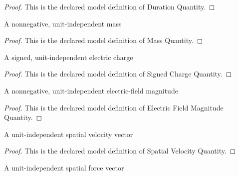 \begin{proof}
  This is the declared model definition of Duration Quantity.
\end{proof}
\begin{definition}
  \label{def:physics:phyx-mini-0912:phyxminiproblems-problemphyxmini0912-massquantity}
  A nonnegative, unit-independent mass
\end{definition}
\begin{proof}
  This is the declared model definition of Mass Quantity.
\end{proof}
\begin{definition}
  \label{def:physics:phyx-mini-0912:phyxminiproblems-problemphyxmini0912-signedchargequantity}
  A signed, unit-independent electric charge
\end{definition}
\begin{proof}
  This is the declared model definition of Signed Charge Quantity.
\end{proof}
\begin{definition}
  \label{def:physics:phyx-mini-0912:phyxminiproblems-problemphyxmini0912-electricfieldmagnitudequantity}
  A nonnegative, unit-independent electric-field magnitude
\end{definition}
\begin{proof}
  This is the declared model definition of Electric Field Magnitude Quantity.
\end{proof}
\begin{definition}
  \label{def:physics:phyx-mini-0912:phyxminiproblems-problemphyxmini0912-spatialvelocityquantity}
  A unit-independent spatial velocity vector
\end{definition}
\begin{proof}
  This is the declared model definition of Spatial Velocity Quantity.
\end{proof}
\begin{definition}
  \label{def:physics:phyx-mini-0912:phyxminiproblems-problemphyxmini0912-spatialforcequantity}
  A unit-independent spatial force vector
\end{definition}
